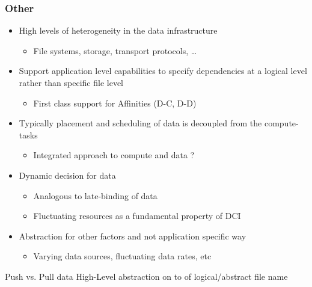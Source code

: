 \documentclass{sig-alternate}
\begin{document}
\subsubsection*{Other}
\begin{itemize}
\item High levels of heterogeneity in the data infrastructure
\begin{itemize}
\item File systems, storage, transport protocols, …
\end{itemize}
\item Support application level capabilities to specify dependencies
  at a logical level rather than specific file level

\begin{itemize}
\item First class support for Affinities (D-C, D-D)
\end{itemize}

\item Typically placement and scheduling of data is decoupled from the compute-tasks

\begin{itemize}
\item Integrated approach to compute and data ?
\end{itemize}

\item Dynamic decision for data

\begin{itemize}
\item Analogous  to late-binding of data
\item Fluctuating resources as a fundamental property of DCI
\end{itemize}

\item Abstraction for other factors and not application specific way
\begin{itemize}
\item Varying data sources, fluctuating data rates, etc
\end{itemize}

\end{itemize}







Push vs. Pull data
High-Level abstraction on to of logical/abstract file name 
\end{document}
